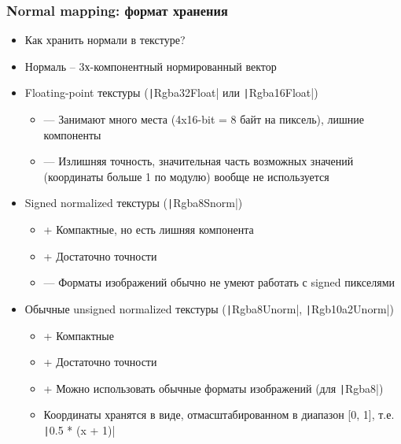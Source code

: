 \documentclass[10pt]{beamer}
\begin{document}
\begin{frame}[fragile]
\frametitle{Normal mapping: формат хранения}
\fontsize{9pt}{9pt}
\begin{itemize}
\item Как хранить нормали в текстуре?
\pause
\item Нормаль -- 3х-компонентный нормированный вектор
\pause
\item Floating-point текстуры (\texttt|Rgba32Float| или \texttt|Rgba16Float|)
\begin{itemize}
\item {\color{red}—} Занимают много места (4x16-bit = 8 байт на пиксель), лишние компоненты
\item {\color{red}—} Излишняя точность, значительная часть возможных значений (координаты больше 1 по модулю) вообще не используется
\end{itemize}
\pause
\item Signed normalized текстуры (\texttt|Rgba8Snorm|)
\begin{itemize}
\item {\color{green}+} Компактные, но есть лишняя компонента
\item {\color{green}+} Достаточно точности
\item {\color{red}—} Форматы изображений обычно не умеют работать с signed пикселями
\end{itemize}
\pause
\item Обычные unsigned normalized текстуры (\texttt|Rgba8Unorm|, \texttt|Rgb10a2Unorm|)
\begin{itemize}
\item {\color{green}+} Компактные
\item {\color{green}+} Достаточно точности
\item {\color{green}+} Можно использовать обычные форматы изображений (для \texttt|Rgba8|)
\item Координаты хранятся в виде, отмасштабированном в диапазон [0, 1], т.е. \texttt|0.5 * (x + 1)|
\end{itemize}
\end{itemize}
\end{frame}
\end{document}
